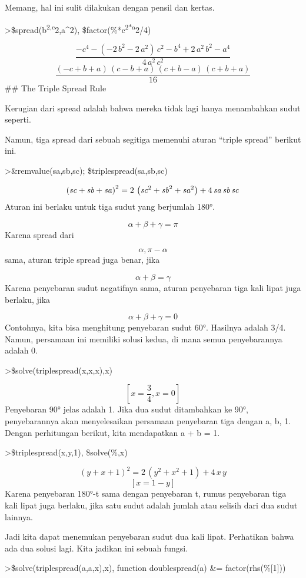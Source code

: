 \documentclass[
]{book}
\begin{document}
Memang, hal ini sulit dilakukan dengan pensil dan kertas.

\textgreater\$spread(b\textsuperscript{2,c}2,a\^{}2), \$factor(\%*c\textsuperscript{2*a}2/4)

\[\frac{-c^4-\left(-2\,b^2-2\,a^2\right)\,c^2-b^4+2\,a^2\,b^2-a^4}{4
 \,a^2\,c^2}\]\[\frac{\left(-c+b+a\right)\,\left(c-b+a\right)\,\left(c+b-a\right)\,
 \left(c+b+a\right)}{16}\]\#\# The Triple Spread Rule

Kerugian dari spread adalah bahwa mereka tidak lagi hanya menambahkan sudut seperti.

Namun, tiga spread dari sebuah segitiga memenuhi aturan ``triple spread'' berikut ini.

\textgreater\&remvalue(sa,sb,sc); \$triplespread(sa,sb,sc)

\[\left({\it sc}+{\it sb}+{\it sa}\right)^2=2\,\left({\it sc}^2+
 {\it sb}^2+{\it sa}^2\right)+4\,{\it sa}\,{\it sb}\,{\it sc}\]Aturan ini berlaku untuk tiga sudut yang berjumlah 180°.

\[\alpha+\beta+\gamma=\pi\]Karena spread dari

\[\alpha, \pi-\alpha\]sama, aturan triple spread juga benar, jika

\[\alpha+\beta=\gamma\]Karena penyebaran sudut negatifnya sama, aturan penyebaran tiga kali lipat juga berlaku, jika

\[\alpha+\beta+\gamma=0\]Contohnya, kita bisa menghitung penyebaran sudut 60°. Hasilnya adalah 3/4. Namun, persamaan ini memiliki solusi kedua, di mana semua penyebarannya adalah 0.

\textgreater\$solve(triplespread(x,x,x),x)

\[\left[ x=\frac{3}{4} , x=0 \right] \]Penyebaran 90° jelas adalah 1. Jika dua sudut ditambahkan ke 90°, penyebarannya akan menyelesaikan persamaan penyebaran tiga dengan a, b, 1. Dengan perhitungan berikut, kita mendapatkan a + b = 1.

\textgreater\$triplespread(x,y,1), \$solve(\%,x)

\[\left(y+x+1\right)^2=2\,\left(y^2+x^2+1\right)+4\,x\,y\]\[\left[ x=1-y \right] \]Karena penyebaran 180°-t sama dengan penyebaran t, rumus penyebaran tiga kali lipat juga berlaku, jika satu sudut adalah jumlah atau selisih dari dua sudut lainnya.

Jadi kita dapat menemukan penyebaran sudut dua kali lipat. Perhatikan bahwa ada dua solusi lagi. Kita jadikan ini sebuah fungsi.

\textgreater\$solve(triplespread(a,a,x),x), function doublespread(a) \&= factor(rhs(\%{[}1{]}))
\end{document}
